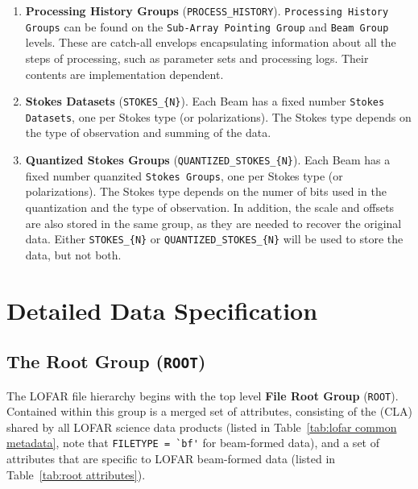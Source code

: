 \documentclass[a4paper,10pt,bibtotoc]{scrartcl}
\begin{document}
\begin{enumerate}
\item \textbf{Processing History Groups} (\verb|PROCESS_HISTORY|). \texttt{Processing History
    Groups} can be found on the \texttt{Sub-Array Pointing Group} and
  \texttt{Beam Group} levels. These are catch-all envelops
  encapsulating information about all the steps of processing, such as
  parameter sets and processing logs. Their contents are implementation dependent.

\item \textbf{Stokes Datasets} (\verb|STOKES_{N}|). Each Beam has a fixed number
  \texttt{Stokes Datasets}, one per Stokes type (or polarizations).  The
  Stokes type depends on the type of observation and summing of the
  data.  

\item \textbf{Quantized Stokes Groups} (\verb|QUANTIZED_STOKES_{N}|). Each Beam has a fixed number
  quanzited \texttt{Stokes Groups}, one per Stokes type (or polarizations).  The
  Stokes type depends on the numer of bits used in the quantization and the type of observation. In addition, the scale and offsets are also stored in the same group, as they are needed to recover the original data. Either \verb|STOKES_{N}| or \verb|QUANTIZED_STOKES_{N}| will be used to store the data, but not both.

\end{enumerate}


\section{Detailed Data Specification}


\label{sec:detailed data structure}



\subsection{The Root Group ({\tt ROOT})}
\label{sec:root group}

The LOFAR file hierarchy begins with the top level \textbf{File Root
  Group} (\verb|ROOT|). Contained within this group is a merged set of attributes, consisting of the {\cla} (CLA) shared by all LOFAR science data products (listed in Table~\ref{tab:lofar common metadata}, note that \verb|FILETYPE = `bf'| for beam-formed data), and a set of attributes that are specific to LOFAR beam-formed data (listed in Table~\ref{tab:root attributes}).
\end{document}
